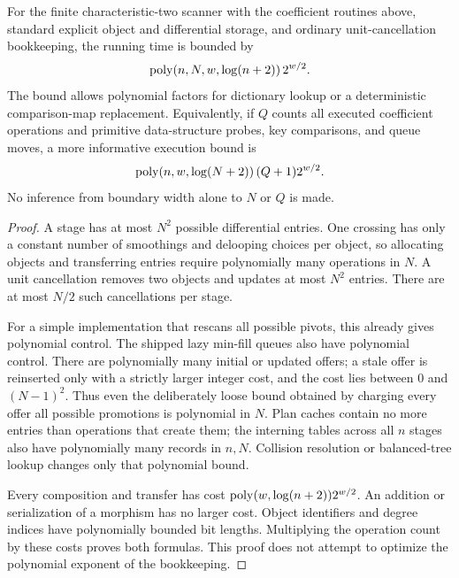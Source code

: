 \begin{theorem}
\label{thm:execution}
For the finite characteristic-two scanner with the coefficient routines
above, standard explicit object and differential storage, and ordinary
unit-cancellation bookkeeping, the running time is bounded by
\begin{equation}
 \operatorname{poly}(n,N,w,\log(n+2))\,2^{w/2}.
 \label{eq:envelope}
\end{equation}
The bound allows polynomial factors for dictionary lookup or a deterministic
comparison-map replacement. Equivalently, if $Q$ counts all executed
coefficient operations and primitive data-structure probes, key comparisons,
and queue moves, a more informative
execution bound is
\begin{equation}
 \operatorname{poly}(n,w,\log(N+2))\,(Q+1)2^{w/2}.
 \label{eq:executed}
\end{equation}
No inference from boundary width alone to $N$ or $Q$ is made.
\end{theorem}
\begin{proof}
A stage has at most $N^2$ possible differential entries. One crossing
has only a constant number of smoothings and delooping choices per object,
so allocating objects and transferring entries require polynomially many
operations in $N$. A unit cancellation removes two objects and updates at
most $N^2$ entries. There are at most $N/2$ such cancellations per stage.

For a simple implementation that rescans all possible pivots, this already
gives polynomial control. The shipped lazy min-fill queues also have
polynomial control. There are polynomially many initial or updated offers;
a stale offer is reinserted only with a strictly larger integer cost, and
the cost lies between $0$ and $(N-1)^2$. Thus even the deliberately loose
bound obtained by charging every offer all possible promotions is
polynomial in $N$. Plan caches contain no more entries than operations
that create them; the interning tables across all $n$ stages also have
polynomially many records in $n,N$. Collision resolution or balanced-tree
lookup changes only that polynomial bound.

Every composition and transfer has cost $\operatorname{poly}(w,\log(n+2))2^{w/2}$.
An addition or serialization of a morphism has no larger cost. Object
identifiers and degree indices have polynomially bounded bit lengths.
Multiplying the operation count by these costs proves both formulas.
This proof does not attempt to optimize the polynomial exponent of the
bookkeeping.
\end{proof}

